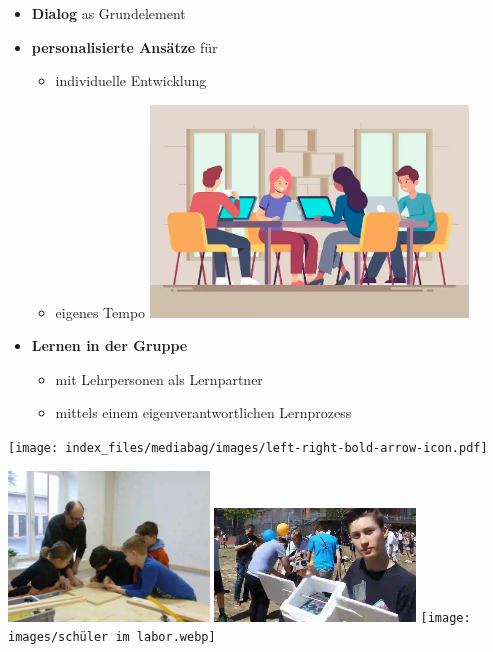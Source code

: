 \documentclass[
  letterpaper,
  DIV=11,
  numbers=noendperiod]{scrartcl}
\providecommand{\tightlist}{%
  \setlength{\itemsep}{0pt}\setlength{\parskip}{0pt}}\usepackage{longtable,booktabs,array}
\begin{document}
\begin{itemize}
\tightlist
\item
  \textbf{Dialog} as Grundelement
\item
  \textbf{personalisierte Ansätze} für

  \begin{itemize}
  \tightlist
  \item
    individuelle Entwicklung
  \item
    eigenes Tempo
    \includegraphics[width=0.7\textwidth,height=\textheight]{images/student-study-group.webp}
  \end{itemize}
\item
  \textbf{Lernen in der Gruppe}

  \begin{itemize}
  \tightlist
  \item
    mit Lehrpersonen als Lernpartner
  \item
    mittels einem eigenverantwortlichen Lernprozess
  \end{itemize}
\end{itemize}

\texttt{[image: index\_files/mediabag/images/left-right-bold-arrow-icon.pdf]}

\includegraphics[width=0.4\textwidth,height=\textheight]{images/Holzwerkstatt_2-1-scaled-crop.webp}
\includegraphics[width=0.4\textwidth,height=\textheight]{images/csm_Finn_mit_Sonde_ea9ce59730.webp}
\texttt{[image: images/schüler im labor.webp]}
\end{document}
